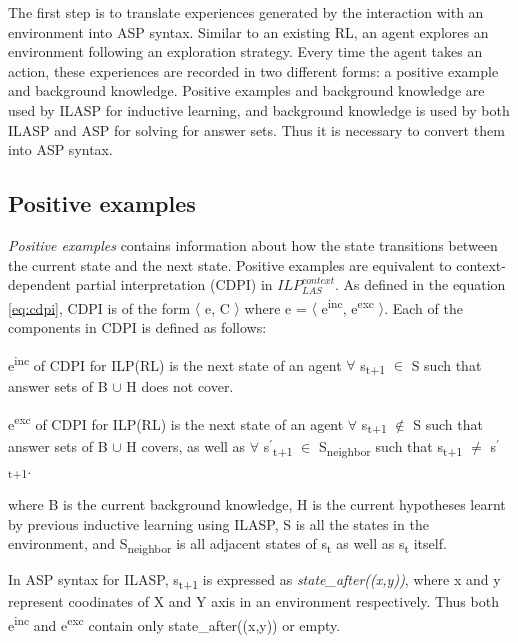 The first step is to translate experiences generated by the interaction with an environment into ASP syntax. 
Similar to an existing RL, an agent explores an environment following an exploration strategy.
Every time the agent takes an action, these experiences are recorded in two different forms: 
a positive example and background knowledge. 
Positive examples and background knowledge are used by ILASP for inductive learning, and background knowledge is used by both ILASP and ASP for solving for answer sets.
Thus it is necessary to convert them into ASP syntax.

\subsection{Positive examples}
\textit{Positive examples} contains information about how the state transitions between the current state and the next state.
Positive examples are equivalent to context-dependent partial interpretation (CDPI) in  $ILP_{LAS}^{context}$. 
As defined in the equation \ref{eq:cdpi}, CDPI is of the form $\langle$ e, C $\rangle$ where e = $\langle$ e\textsuperscript{inc}, e\textsuperscript{exc} $\rangle$. 
Each of the components in CDPI is defined as follows:
\begin{defn}
e\textsuperscript{inc} of CDPI for ILP(RL) is the next state of an agent $\forall$ s\textsubscript{t+1} $\in$ S such that answer sets of B $\cup$ H does not cover.
\end{defn}

\begin{defn}
e\textsuperscript{exc} of CDPI for ILP(RL) is the next state of an agent $\forall$ s\textsubscript{t+1} $\not\in$ S such that answer sets of B $\cup$ H covers,
as well as $\forall$ s$^\prime$\textsubscript{t+1} $\in$ S\textsubscript{neighbor} such that s\textsubscript{t+1} $\neq$ s$^\prime$\textsubscript{t+1}.
\end{defn}
where B is the current background knowledge, H is the current hypotheses learnt by previous inductive learning using ILASP, S is all the states in the environment, and S\textsubscript{neighbor} is all adjacent states of s\textsubscript{t} as well as s\textsubscript{t} itself.

In ASP syntax for ILASP, s\textsubscript{t+1} is expressed as \textit{state\_after((x,y))}, where x and y represent coodinates of X and Y axis in an environment respectively.
Thus both e\textsuperscript{inc} and e\textsuperscript{exc} contain only state\_after((x,y)) or empty.

